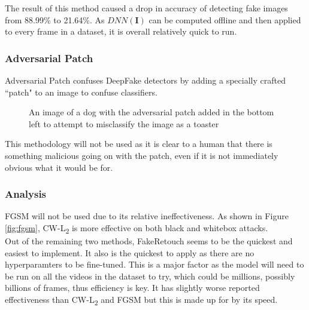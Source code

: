 \documentclass{article}
\begin{document}
The result of this method caused a drop in accuracy of detecting fake images from 88.99\% to 21.64\%. As $DNN(\mathbf{I})$ can be computed offline and then applied to every frame in a dataset, it is overall relatively quick to run.

\subsubsection{Adversarial Patch}

Adversarial Patch confuses DeepFake detectors by adding a specially crafted ``patch" to an image to confuse classifiers\cite{brown2017adversarial}.

\begin{figure}[H]
    \centering
    \caption{An image of a dog with the adversarial patch added in the bottom left to attempt to misclassify the image as a toaster\cite{brown2017adversarial}}
\end{figure}

This methodology will not be used as it is clear to a human that there is something malicious going on with the patch, even if it is not immediately obvious what it would be for.

\subsubsection{Analysis}

FGSM will not be used due to its relative ineffectiveness. As shown in Figure \ref{fig:fgsm}, CW-L\textsubscript{2} is more effective on both black and whitebox attacks.\\

Out of the remaining two methods, FakeRetouch seems to be the quickest and easiest to implement. It also is the quickest to apply as there are no hyperparamters to be fine-tuned\cite{huang2020fakeretouch}. This is a major factor as the model will need to be run on all the videos in the dataset to try, which could be millions, possibly billions of frames, thus efficiency is key. It has slightly worse reported effectiveness than CW-L\textsubscript{2} and FGSM but this is made up for by its speed.\\
\end{document}
